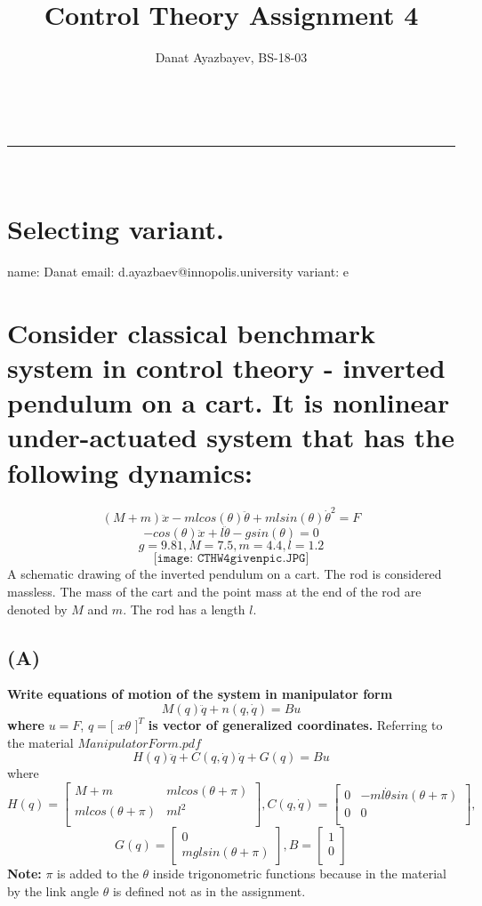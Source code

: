\documentclass[a4paper,11pt]{article}
\makeatletter
\newcommand{\linia}{\rule{\linewidth}{0.5pt}}
\theoremstyle{mytheor}
\renewcommand{\maketitle}{
\begin{center}
\vspace{2ex}
{\huge \textsc{\@title}}
\vspace{1ex}
\\
\linia\\
\@author \hfill \@date
\vspace{4ex}
\end{center}
}
\makeatother
\begin{document}
\title{Control Theory Assignment \textnumero{} 4}

\author{Danat Ayazbayev, BS-18-03}

\maketitle

\section*{Selecting variant.}
name: Danat\newline
email: d.ayazbaev@innopolis.university\newline
variant: e

\section*{Consider classical benchmark system in control theory - inverted pendulum on a cart. It is nonlinear under-actuated system that has the following dynamics:}
\[
(M+m)\ddot{x}-mlcos(\theta)\ddot{\theta}+mlsin(\theta)\dot{\theta}^{2}=F
\]
\[
-cos(\theta)\ddot{x}+l\ddot{\theta}-gsin(\theta)=0
\]
\[
g=9.81, M=7.5, m=4.4, l=1.2
\]
\[
\texttt{[image: CTHW4givenpic.JPG]}
\]
A schematic drawing of the inverted pendulum on a cart. The rod is considered massless. The mass of the cart and the point mass at the end of the rod are denoted by $M$ and $m$. The rod has a length $l$.
\subsection*{(A)} 
\textbf{Write equations of motion of the system in manipulator form} \newline
\[
M(q)\ddot{q}+n(q,\dot{q})=Bu
\]
\textbf{where} $u = F$, $q = [$ $x$\space\space$\theta$ $]^{T}$ \textbf{is vector of generalized coordinates.}\newline
Referring to the material $ManipulatorForm.pdf$\newline
\[
    H(q)\ddot{q}+C(q, \dot{q})\dot{q}+G(q)=Bu
\]
where
\[
H(q)=
\begin{bmatrix}
M+m&mlcos(\theta+\pi)\\
mlcos(\theta+\pi)&ml^{2}\\
\end{bmatrix}
,
C(q, \dot{q})=
\begin{bmatrix}
0&-ml\dot{\theta} sin(\theta+\pi)\\
0&0\\
\end{bmatrix},
\]
\[
G(q)=
\begin{bmatrix}
0\\
mglsin(\theta+\pi)
\end{bmatrix}
,
B=
\begin{bmatrix}
1\\
0\\
\end{bmatrix}
\]
\textbf{Note:} $\pi$ is added to the $\theta$ inside trigonometric functions because in the material by the link angle $\theta$ is defined not as in the assignment.\newline 
\end{document}
